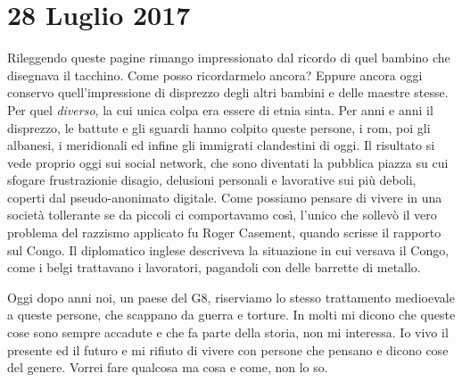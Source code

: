 \section{28 Luglio 2017}
Rileggendo queste pagine rimango impressionato dal ricordo di quel bambino che disegnava il tacchino. Come posso ricordarmelo ancora? Eppure ancora oggi conservo quell'impressione di disprezzo degli altri bambini e delle maestre stesse. Per quel \emph{diverso}, la cui unica colpa era essere di etnia sinta. Per anni e anni il disprezzo, le battute e gli sguardi hanno colpito queste persone, i rom, poi gli albanesi, i meridionali ed infine gli immigrati clandestini di oggi. Il risultato si vede proprio oggi sui social network, che sono diventati la pubblica piazza su cui sfogare frustrazionie disagio, delusioni personali e lavorative sui più deboli, coperti dal pseudo-anonimato digitale.\newline
Come possiamo pensare di vivere in una società tollerante se da piccoli ci comportavamo così, l'unico che sollevò il vero problema del razzismo applicato fu Roger Casement, quando scrisse il rapporto sul Congo. Il diplomatico inglese descriveva la situazione in cui versava il Congo, come i belgi trattavano i lavoratori, pagandoli con delle barrette di metallo.\newline

Oggi dopo anni noi, un paese del G8, riserviamo lo stesso trattamento medioevale a queste persone, che scappano da guerra e torture. In molti mi dicono che queste cose sono sempre accadute e che fa parte della storia, non mi interessa. Io vivo il presente ed il futuro e mi rifiuto di vivere con persone che pensano e dicono cose del genere. Vorrei fare qualcosa ma cosa e come, non lo so.
